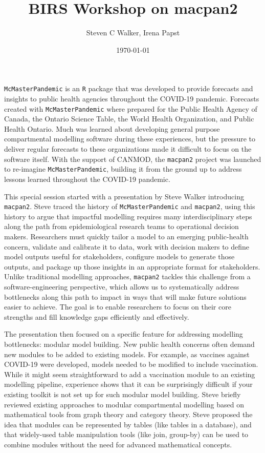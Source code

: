 \documentclass{article}
\title{BIRS Workshop on macpan2}
\date{\today}
\author{Steven C Walker, Irena Papst}
\newcommand{\macpan}{\texttt{macpan2}\xspace}
\newcommand{\macpanOrig}{\texttt{McMasterPandemic}\xspace}
\newcommand{\R}{\texttt{R}\xspace}
\begin{document}
  \maketitle

  \macpanOrig is an \R package that was developed to provide forecasts and insights to public health agencies throughout the COVID-19 pandemic. Forecasts created with \macpanOrig where prepared for the Public Health Agency of Canada, the Ontario Science Table, the World Health Organization, and Public Health Ontario. Much was learned about developing general purpose compartmental modelling software during these experiences, but the pressure to deliver regular forecasts to these organizations made it difficult to focus on the software itself. With the support of CANMOD, the \macpan project was launched to re-imagine \macpanOrig, building it from the ground up to address lessons learned throughout the COVID-19 pandemic.

  This special session started with a presentation by Steve Walker introducing \macpan. Steve traced the history of \macpanOrig and \macpan, using this history to argue that impactful modelling requires many interdisciplinary steps along the path from epidemiological research teams to operational decision makers. Researchers must quickly tailor a model to an emerging public-health concern, validate and calibrate it to data, work with decision makers to define model outputs useful for stakeholders, configure models to generate those outputs, and package up those insights in an appropriate format for stakeholders. Unlike traditional modelling approaches, \macpan tackles this challenge from a software-engineering perspective, which allows us to systematically address bottlenecks along this path to impact in ways that will make future solutions easier to achieve. The goal is to enable researchers to focus on their core strengths and fill knowledge gaps efficiently and effectively.

  The presentation then focused on a specific feature for addressing modelling bottlenecks: modular model building. New public health concerns often demand new modules to be added to existing models. For example, as vaccines against COVID-19 were developed, models needed to be modified to include vaccination. While it might seem straightforward to add a vaccination module to an existing modelling pipeline, experience shows that it can be surprisingly difficult if your existing toolkit is not set up for such modular model building. Steve briefly reviewed existing approaches to modular compartmental modelling based on mathematical tools from graph theory and category theory. Steve proposed the idea that modules can be represented by tables (like tables in a database), and that widely-used table manipulation tools (like join, group-by) can be used to combine modules without the need for advanced mathematical concepts.
\end{document}
